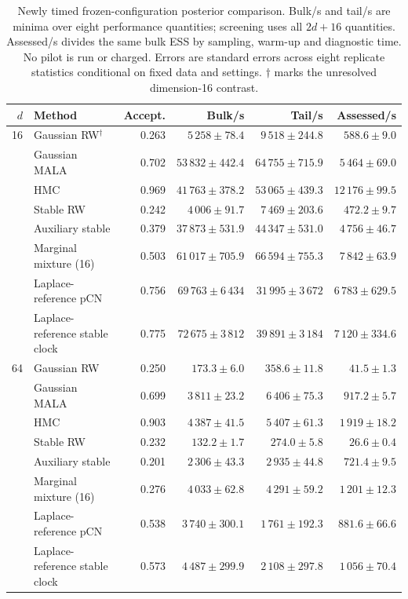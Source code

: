 \documentclass[pdflatex,iicol,sn-mathphys-ay]{sn-jnl}
\theoremstyle{definition}\newtheorem{definition}[theorem]{Definition}
\theoremstyle{remark}\newtheorem{remark}[theorem]{Remark}
\numberwithin{equation}{section}
\newcommand{\1}{\mathbf 1}
\begin{document}
\begin{table}[t]\centering\small
\caption{Newly timed frozen-configuration posterior comparison. Bulk/s and tail/s are minima over eight performance quantities; screening uses all $2d+16$ quantities. Assessed/s divides the same bulk ESS by sampling, warm-up and diagnostic time. No pilot is run or charged. Errors are standard errors across eight replicate statistics conditional on fixed data and settings. $\dagger$ marks the unresolved dimension-16 contrast.}\label{tab:bayes_eff}
\begin{tabular}{rlrrrr}\toprule $d$ & Method & Accept. & Bulk/s & Tail/s & Assessed/s\\\midrule
16 & Gaussian RW$^\dagger$ & 0.263 & $5\,258\pm 78.4$ & $9\,518\pm 244.8$ & $588.6\pm 9.0$\\
 & Gaussian MALA & 0.702 & $53\,832\pm 442.4$ & $64\,755\pm 715.9$ & $5\,464\pm 69.0$\\
 & HMC & 0.969 & $41\,763\pm 378.2$ & $53\,065\pm 439.3$ & $12\,176\pm 99.5$\\
 & Stable RW & 0.242 & $4\,006\pm 91.7$ & $7\,469\pm 203.6$ & $472.2\pm 9.7$\\
 & Auxiliary stable & 0.379 & $37\,873\pm 531.9$ & $44\,347\pm 531.0$ & $4\,756\pm 46.7$\\
 & Marginal mixture (16) & 0.503 & $61\,017\pm 705.9$ & $66\,594\pm 755.3$ & $7\,842\pm 63.9$\\
 & Laplace-reference pCN & 0.756 & $69\,763\pm 6\,434$ & $31\,995\pm 3\,672$ & $6\,783\pm 629.5$\\
 & Laplace-reference stable clock & 0.775 & $72\,675\pm 3\,812$ & $39\,891\pm 3\,184$ & $7\,120\pm 334.6$\\
\midrule
64 & Gaussian RW & 0.250 & $173.3\pm 6.0$ & $358.6\pm 11.8$ & $41.5\pm 1.3$\\
 & Gaussian MALA & 0.699 & $3\,811\pm 23.2$ & $6\,406\pm 75.3$ & $917.2\pm 5.7$\\
 & HMC & 0.903 & $4\,387\pm 41.5$ & $5\,407\pm 61.3$ & $1\,919\pm 18.2$\\
 & Stable RW & 0.232 & $132.2\pm 1.7$ & $274.0\pm 5.8$ & $26.6\pm 0.4$\\
 & Auxiliary stable & 0.201 & $2\,306\pm 43.3$ & $2\,935\pm 44.8$ & $721.4\pm 9.5$\\
 & Marginal mixture (16) & 0.276 & $4\,033\pm 62.8$ & $4\,291\pm 59.2$ & $1\,201\pm 12.3$\\
 & Laplace-reference pCN & 0.538 & $3\,740\pm 300.1$ & $1\,761\pm 192.3$ & $881.6\pm 66.6$\\
 & Laplace-reference stable clock & 0.573 & $4\,487\pm 299.9$ & $2\,108\pm 297.8$ & $1\,056\pm 70.4$\\
\bottomrule\end{tabular}\end{table}
\end{document}
